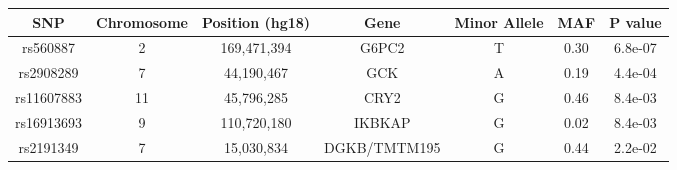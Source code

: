 \begin{table}[ht]
\centering
\begingroup\tiny
\begin{tabular}{ccccccc}
  \hline
SNP & Chromosome & Position (hg18) & Gene & Minor Allele & MAF & P value \\ 
  \hline
rs560887 &   2 & 169,471,394 & G6PC2 & T & 0.30 & 6.8e-07 \\ 
  rs2908289 &   7 &  44,190,467 & GCK & A & 0.19 & 4.4e-04 \\ 
  rs11607883 &  11 &  45,796,285 & CRY2 & G & 0.46 & 8.4e-03 \\ 
  rs16913693 &   9 & 110,720,180 & IKBKAP & G & 0.02 & 8.4e-03 \\ 
  rs2191349 &   7 &  15,030,834 & DGKB/TMTM195 & G & 0.44 & 2.2e-02 \\ 
   \hline
\end{tabular}
\endgroup
\end{table}
